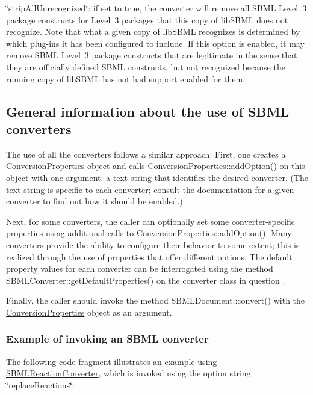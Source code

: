 \begin{DoxyItemize}
\item {\ttfamily \char`\"{}strip\+All\+Unrecognized\char`\"{}}\+: if set to {\ttfamily true}, the converter will remove all S\+B\+ML Level~3 package constructs for Level~3 packages that this copy of lib\+S\+B\+ML does not recognize. Note that what a given copy of lib\+S\+B\+ML recognizes is determined by which plug-\/ins it has been configured to include. If this option is enabled, it may remove S\+B\+ML Level~3 package constructs that are legitimate in the sense that they are officially defined S\+B\+ML constructs, but not recognized because the running copy of lib\+S\+B\+ML has not had support enabled for them.\end{DoxyItemize}
\hypertarget{classdoc__section__using__sbml__converters_using-converters}{}\subsection{General information about the use of S\+B\+M\+L converters}\label{classdoc__section__using__sbml__converters_using-converters}
The use of all the converters follows a similar approach. First, one creates a \hyperlink{class_conversion_properties}{Conversion\+Properties} object and calls Conversion\+Properties\+::add\+Option() on this object with one argument\+: a text string that identifies the desired converter. (The text string is specific to each converter; consult the documentation for a given converter to find out how it should be enabled.)

Next, for some converters, the caller can optionally set some converter-\/specific properties using additional calls to Conversion\+Properties\+::add\+Option(). Many converters provide the ability to configure their behavior to some extent; this is realized through the use of properties that offer different options. The default property values for each converter can be interrogated using the method S\+B\+M\+L\+Converter\+::get\+Default\+Properties() on the converter class in question .

Finally, the caller should invoke the method S\+B\+M\+L\+Document\+::convert() with the \hyperlink{class_conversion_properties}{Conversion\+Properties} object as an argument.\hypertarget{classdoc__section__using__sbml__converters_converter-example}{}\subsubsection{Example of invoking an S\+B\+M\+L converter}\label{classdoc__section__using__sbml__converters_converter-example}
The following code fragment illustrates an example using \hyperlink{class_s_b_m_l_reaction_converter}{S\+B\+M\+L\+Reaction\+Converter}, which is invoked using the option string {\ttfamily \char`\"{}replace\+Reactions\char`\"{}}\+:

